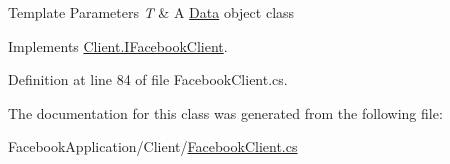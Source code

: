 \begin{DoxyTemplParams}{Template Parameters}
{\em T} & A \hyperlink{namespace_data}{Data} object class\\
\hline
\end{DoxyTemplParams}


Implements \hyperlink{interface_client_1_1_i_facebook_client_adcc547867f709ce07787df58233c0b85}{Client.\+I\+Facebook\+Client}.



Definition at line 84 of file Facebook\+Client.\+cs.



The documentation for this class was generated from the following file\+:\begin{DoxyCompactItemize}
\item 
Facebook\+Application/\+Client/\hyperlink{_facebook_client_8cs}{Facebook\+Client.\+cs}\end{DoxyCompactItemize}
